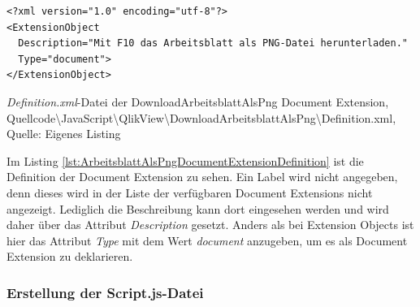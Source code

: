 \ifIncludeFigures\begin{listing}[htbp]
\begin{verbatim}
<?xml version="1.0" encoding="utf-8"?>
<ExtensionObject
  Description="Mit F10 das Arbeitsblatt als PNG-Datei herunterladen."
  Type="document">
</ExtensionObject>
\end{verbatim}
\caption[\textit{Definition.xml}-Datei der DownloadArbeitsblattAlsPng Document Extension]{\textit{Definition.xml}-Datei der DownloadArbeitsblattAlsPng Document Extension, \\Quellcode\textbackslash{}JavaScript\textbackslash{}QlikView\textbackslash{}DownloadArbeitsblattAlsPng\textbackslash{}Definition.xml, \\Quelle: Eigenes Listing}
\label{lst:ArbeitsblattAlsPngDocumentExtensionDefinition}
\end{listing}\fi

Im Listing \ref{lst:ArbeitsblattAlsPngDocumentExtensionDefinition} ist die Definition der Document Extension zu sehen. Ein Label wird nicht angegeben, denn dieses wird in der Liste der verfügbaren Document Extensions nicht angezeigt. Lediglich die Beschreibung kann dort eingesehen werden und wird daher über das Attribut \textit{Description} gesetzt. Anders als bei Extension Objects ist hier das Attribut \textit{Type} mit dem Wert \textit{document} anzugeben, um es als Document Extension zu deklarieren.

\subsubsection{Erstellung der Script.js-Datei}

